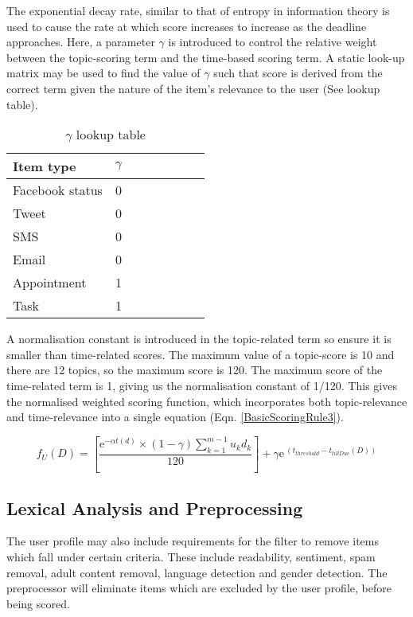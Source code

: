 The exponential decay rate, similar to that of entropy in information theory is used to cause the rate at which score increases to increase as the deadline approaches. 
Here, a parameter $\gamma$ is introduced to control the relative weight between the topic-scoring term and the time-based scoring term. A static look-up matrix may be used to find the value of $\gamma$ such that score is derived from the correct term given the nature of the item's relevance to the user (See lookup table).

\begin{table}\label{BetaLookup}
\begin{center}
	\begin{tabular}{l*{6}{c}r}
		Item type        & $\gamma$ \\
		\hline
		Facebook status  & 0 \\
		Tweet            & 0 \\
		SMS          	 & 0 \\
		Email    		 & 0 \\
		Appointment      & 1 \\
		Task		     & 1 \\
	\end{tabular}
	\caption{$\gamma$ lookup table}
\end{center}
\end{table}

A normalisation constant is introduced in the topic-related term so ensure it is smaller than time-related scores. The maximum value of a topic-score is 10 and there are 12 topics, so the maximum score is 120. The maximum score of the time-related term is 1, giving us the normalisation constant of 1/120.
This gives the normalised weighted scoring function, which incorporates both topic-relevance and time-relevance into a single equation (Eqn. \ref{BasicScoringRule3}).

\begin{equation}\label{BasicScoringRule3}
	f_U (D) = \left[\frac{{\mathrm{e}}^{-\alpha t(d)} \times (1-\gamma) \sum_{k=1}^{m-1} u_kd_k}{120} \right] + \gamma{\mathrm{e}}^{\ (t_{threshold}-t_{tillDue}(D))}
\end{equation}

\subsection{Lexical Analysis and Preprocessing}

The user profile may also include requirements for the filter to remove items which fall under certain criteria. These include readability, sentiment, spam removal, adult content removal, language detection and gender detection. The preprocessor will eliminate items which are excluded by the user profile, before being scored. 

